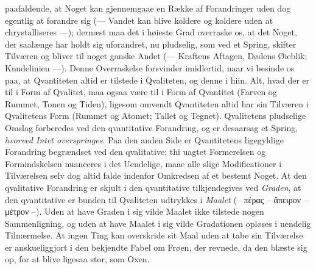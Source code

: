 \documentclass[12pt]{book}
\begin{document}
paafaldende, at Noget kan gjennemgaae en Række af Forandringer uden dog egentlig at
forandre sig (--- Vandet kan blive koldere og koldere uden at chrystalliseres ---);
dernæst maa det i høieste Grad overraske os, at det Noget, der saalænge har holdt sig
uforandret, nu pludselig, som ved et Spring, skifter Tilværen og bliver til noget
ganske Andet (--- Kraftens Aftagen, Dødens Øieblik; Knudelinien ---). Denne
Overraskelse forsvinder imidlertid, naar vi besinde os paa, at Qvantiteten altid er
tilstede i Qvaliteten, og denne i hiin. Alt, hvad der er til i Form af Qvalitet, maa
ogsaa være til i Form af Qvantitet (Farven og Rummet, Tonen og Tiden), ligesom omvendt
Qvantiteten altid har sin Tilværen i Qvalitetens Form (Rummet og Atomet; Tallet og
Tegnet). Qvalitetens pludselige Omslag forberedes ved den qvantitative Forandring, og
er desaarsag et Spring, \emph{hvorved Intet overspringes}. Paa den anden Side er
Qvantitetens ligegyldige Forandring begrændset ved den qvalitative; thi uagtet
Formerelsen og Formindskelsen nuanceres i det Uendelige, maae alle slige
Modificationer i Tilværelsen selv dog altid falde indenfor Omkredsen af et bestemt
Noget. At den qvalitative Forandring er skjult i den qvantitative tilkjendegives ved
\emph{Graden}, at den qvantitative er bunden til Qvaliteten udtrykkes i \emph{Maalet}
(-- πέρας -- ἄπειρον -- μέτρον --). Uden at have Graden i sig vilde Maalet ikke
tilstede nogen Sammenligning, og uden at have Maalet i sig vilde Gradationen opløses i
uendelig Tilnærmelse. At ingen Ting kan overskride sit Maal uden at tabe sin
Tilværelse er anskueliggjort i den bekjendte Fabel om Frøen, der revnede, da den
blæste sig op, for at blive ligesaa stor, som Oxen.
\end{document}

